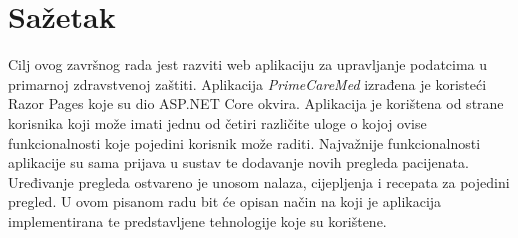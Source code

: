 \section*{Sažetak}
\label{sec:summary}
Cilj ovog završnog rada jest razviti web aplikaciju za upravljanje podatcima u primarnoj zdravstvenoj zaštiti. Aplikacija \textit{PrimeCareMed} izrađena je koristeći Razor Pages koje su dio ASP.NET Core okvira. Aplikacija je korištena od strane korisnika koji može imati jednu od četiri različite uloge o kojoj ovise funkcionalnosti koje pojedini korisnik može raditi. Najvažnije funkcionalnosti aplikacije su sama prijava u sustav te dodavanje novih pregleda pacijenata. Uređivanje pregleda ostvareno je unosom nalaza, cijepljenja i recepata za pojedini pregled. U ovom pisanom radu bit će opisan način na koji je aplikacija implementirana te predstavljene tehnologije koje su korištene.

